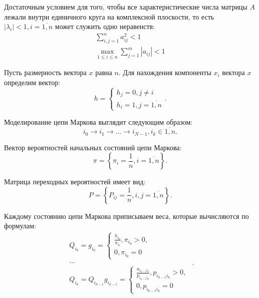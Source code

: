 Достаточным условием для того, чтобы все характеристические числа матрицы $A$ лежали внутри единичного круга на комплексной плоскости, то есть $|\lambda_{i}| < 1, i = \overline{1, n}$ может служить одно неравенств:
\begin{equation}
	\begin{array}{l}
		\sum\limits_{i,j=1}^{n}a_{ij}^{2} < 1 \\
		\max\limits_{1 \leqslant i \leqslant n}\sum\limits_{j=1}^{m}|a_{ij}|<1
	\end{array}
\end{equation}

Пусть размерность вектора $x$ равна $n$. Для нахождения компоненты $x_{i}$ вектора $x$ определим вектор:
\begin{equation}
	h=\begin{cases}
		h_{j}=0, j \neq i \\
		h_{i}=1, j = \overline{1,n}
	\end{cases}.
\end{equation}

Моделирование цепи Маркова выглядит следующим образом:
\begin{equation}
	i_{0} \rightarrow i_{1} \rightarrow \ldots \rightarrow i_{N-1}, i_{k} \in {\overline{1,n}}.
\end{equation}

Вектор вероятностей начальных состояний цепи Маркова:
\begin{equation}
	\pi = \left\lbrace\pi_{i} = \frac{1}{n}, i = \overline{1,n} \right\rbrace.
\end{equation}

Матрица переходных вероятностей имеет вид:
\begin{equation}
	P = \left\lbrace P_{ij} = \frac{1}{n}, i,j = \overline{1,n} \right\rbrace.
\end{equation}

Каждому состоянию цепи Маркова приписываем веса, которые вычисляются по формулам:
\begin{equation}
	\begin{array}{l}
		Q_{i_{0}}=g_{i_{0}}=\begin{cases}
			\frac{h_{i_{0}}}{\pi_{i_{0}}}, \pi_{i_{0}} > 0, \\
			0, \pi_{i_{0}} = 0
		\end{cases} \\
		\ldots                                         \\
		Q_{i_{k}}=Q_{i_{k-1}}g_{i_{k-1}}=\begin{cases}
			\frac{a_{i_{k-1}i_{k}}}{p_{i_{k-1}i_{k}}}, p_{i_{k-1}i_{k}} > 0, \\
			0, p_{i_{k-1}i_{k}} = 0
		\end{cases}
	\end{array}.
\end{equation}

